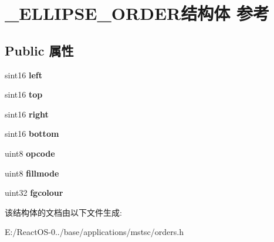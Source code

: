 \hypertarget{struct___e_l_l_i_p_s_e___o_r_d_e_r}{}\section{\+\_\+\+E\+L\+L\+I\+P\+S\+E\+\_\+\+O\+R\+D\+E\+R结构体 参考}
\label{struct___e_l_l_i_p_s_e___o_r_d_e_r}
\subsection*{Public 属性}
\begin{DoxyCompactItemize}
\item 
\mbox{\label{struct___e_l_l_i_p_s_e___o_r_d_e_r_a08ca9b0b8f5a06ba3386693fe59abfd2}} 
sint16 {\bfseries left}
\item 
\mbox{\label{struct___e_l_l_i_p_s_e___o_r_d_e_r_a0c13aff9647254bb905f7d985c0153ae}} 
sint16 {\bfseries top}
\item 
\mbox{\label{struct___e_l_l_i_p_s_e___o_r_d_e_r_ae0d74705cbd48398322d62074c63b768}} 
sint16 {\bfseries right}
\item 
\mbox{\label{struct___e_l_l_i_p_s_e___o_r_d_e_r_a41791973fb3906dafc2ec132834e7ad6}} 
sint16 {\bfseries bottom}
\item 
\mbox{\label{struct___e_l_l_i_p_s_e___o_r_d_e_r_a67a568f17a6eddf8b94747ba2cd6ad2b}} 
uint8 {\bfseries opcode}
\item 
\mbox{\label{struct___e_l_l_i_p_s_e___o_r_d_e_r_a4d87a2a5329a6e5c2bc12a6f6fa2409b}} 
uint8 {\bfseries fillmode}
\item 
\mbox{\label{struct___e_l_l_i_p_s_e___o_r_d_e_r_a78b2c299f9097033a21a06a408f545bb}} 
uint32 {\bfseries fgcolour}
\end{DoxyCompactItemize}


该结构体的文档由以下文件生成\+:\begin{DoxyCompactItemize}
\item 
E\+:/\+React\+O\+S-\/0../base/applications/mstsc/orders.\+h\end{DoxyCompactItemize}
